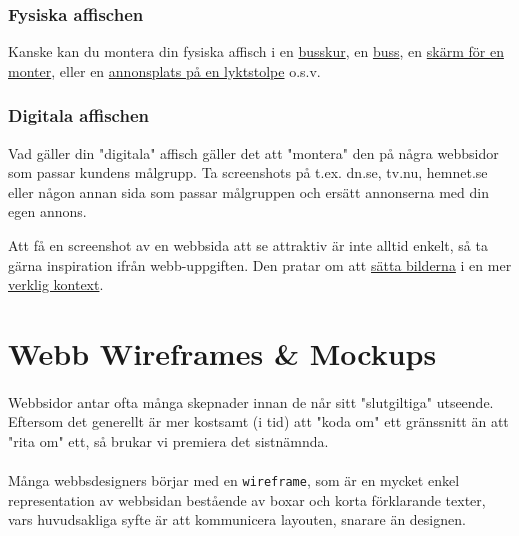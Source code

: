 \documentclass{article}
\begin{document}
      \subsubsection*{ Fysiska affischen }
        Kanske kan du montera din fysiska affisch i en
        \href{https://www.google.se/search?q=bus+shelter&es_sm=91&source=lnms&tbm=isch&sa=X&ei=WlQEVOaELYWCzAOLk4HgCg&ved=0CAgQ_AUoAQ&biw=1280&bih=1342}{busskur},
        en 
        \href{https://www.google.se/search?q=buss+uppsala&um=1&ie=UTF-8&hl=sv&tbm=isch&source=og&sa=N&tab=wi&ei=da8sUsrOFKGN7QbtnYGgDg&biw=1680&bih=929&sei=d68sUuidE4PZ4ASP_4DIBQ}{buss},
        en
        \href{http://www.laurisha.com/wp-content/uploads/2013/04/GradShow-BannerMockup.png}{skärm för en monter},
        eller en
        \href{http://www.martinholm.com/wp-content/uploads/banner_mockup.jpg}{annonsplats på en lyktstolpe}
        o.s.v.

    \subsubsection*{ Digitala affischen }
      Vad gäller din "digitala" affisch gäller det att "montera" den på några webbsidor som passar kundens målgrupp. Ta screenshots på t.ex. dn.se, tv.nu, hemnet.se eller någon annan sida som passar målgruppen och ersätt annonserna med din egen annons.

      Att få en screenshot av en webbsida att se attraktiv är inte alltid enkelt, så ta gärna inspiration ifrån webb-uppgiften. Den pratar om att
      \href{http://dribbble.com/shots/1226243-Wp-Theme-Experiment?list=popular&offset=1}{sätta bilderna}
      i en mer
      \href{https://dribbble.com/shots/1180508-Challenge-View-Stats?list=users&offset=28}{verklig kontext}.

  \newpage
  \section{Webb Wireframes \& Mockups}
    \paragraph{}
    Webbsidor antar ofta många skepnader innan de når sitt "slutgiltiga" utseende. Eftersom det generellt är mer kostsamt (i tid) att "koda om" ett gränssnitt än att "rita om" ett, så brukar vi premiera det sistnämnda.

    \paragraph{}
    Många webbsdesigners börjar med en \texttt{wireframe}, som är en mycket enkel representation av webbsidan bestående av boxar och korta förklarande texter, vars huvudsakliga syfte är att kommunicera layouten, snarare än designen. 
\end{document}
